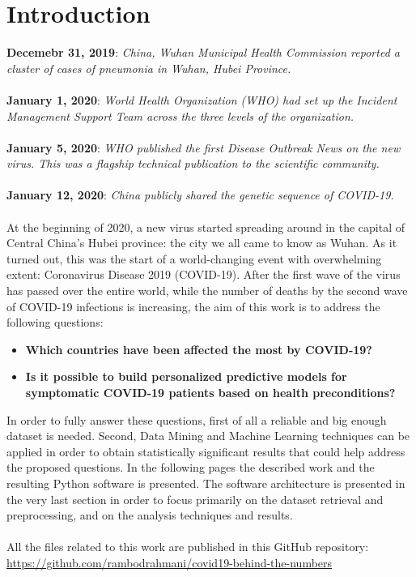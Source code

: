 \documentclass[11pt,a4paper]{article}
\begin{document}
\section{Introduction}
\textbf{Decemebr 31, 2019}: \textit{China, Wuhan Municipal Health Commission
reported a cluster of cases of pneumonia in Wuhan, Hubei Province.}\\
\\
\textbf{January 1, 2020}: \textit{World Health Organization (WHO) had set up the
Incident Management Support Team across the three levels of the organization.}\\
\\
\textbf{January 5, 2020}: \textit{WHO published the first Disease Outbreak News
on the new virus. This was a flagship technical publication to the scientific
community.}\\
\\
\textbf{January 12, 2020}: \textit{China publicly shared the genetic sequence of
COVID-19.}\\
\\
At the beginning of 2020, a new virus started spreading around in the capital of
Central China's Hubei province: the city we all came to know as Wuhan. As it
turned out, this was the start of a world-changing event with overwhelming
extent: Coronavirus Disease 2019 (COVID-19). After the first wave of the virus
has passed over the entire world, while the number of deaths by the second wave
of COVID-19 infections is increasing, the aim of this work is to address the
following questions:
\begin{itemize}
	\item \textbf{Which countries have been affected the most by COVID-19?}
	\item \textbf{Is it possible to build personalized predictive models for
		symptomatic COVID-19 patients based on health preconditions?}
\end{itemize}
In order to fully answer these questions, first of all a reliable and big enough
dataset is needed. Second, Data Mining and Machine Learning techniques can be
applied in order to obtain statistically significant results that could help
address the proposed questions. In the following pages the described work and
the resulting Python software is presented. The software architecture is
presented in the very last section in order to focus primarily on the dataset
retrieval and preprocessing, and on the analysis techniques and results.\\
\\
All the files related to this work are published in this GitHub repository:
\url{https://github.com/rambodrahmani/covid19-behind-the-numbers}
\end{document}
